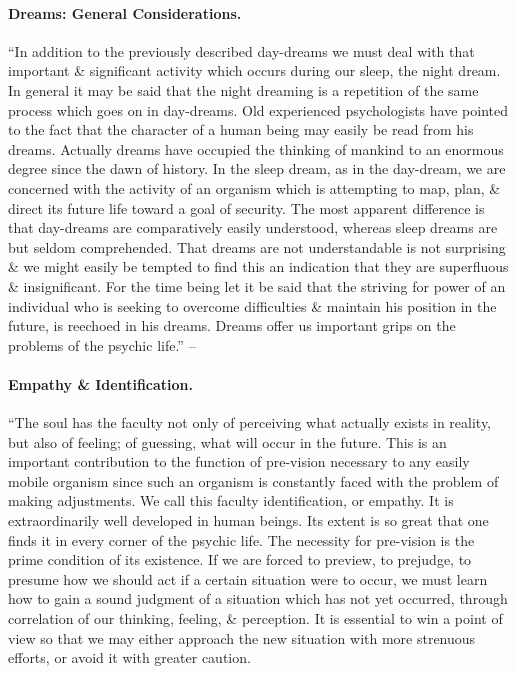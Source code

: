 \documentclass{article}
\begin{document}
\paragraph{Dreams: General Considerations.} ``In addition to the previously described day-dreams we must deal with that important \& significant activity which occurs during our sleep, the night dream. In general it may be said that the night dreaming is a repetition of the same process which goes on in day-dreams. Old experienced psychologists have pointed to the fact that the character of a human being may easily be read from his dreams. Actually dreams have occupied the thinking of mankind to an enormous degree since the dawn of history. In the sleep dream, as in the day-dream, we are concerned with the activity of an organism which is attempting to map, plan, \& direct its future life toward a goal of security. The most apparent difference is that day-dreams are comparatively easily understood, whereas sleep dreams are but seldom comprehended. That dreams are not understandable is not surprising \& we might easily be tempted to find this an indication that they are superfluous \& insignificant. For the time being let it be said that the striving for power of an individual who is seeking to overcome difficulties \& maintain his position in the future, is reechoed in his dreams. Dreams offer us important grips on the problems of the psychic life.'' -- \cite[pp. 59--60]{Adler_human_nature}

\paragraph{Empathy \& Identification.} ``The soul has the faculty not only of perceiving what actually exists in reality, but also of feeling; of guessing, what will occur in the future. This is an important contribution to the function of pre-vision necessary to any easily mobile organism since such an organism is constantly faced with the problem of making adjustments. We call this faculty identification, or empathy. It is extraordinarily well developed in human beings. Its extent is so great that one finds it in every corner of the psychic life. The necessity for pre-vision is the prime condition of its existence. If we are forced to preview, to prejudge, to presume how we should act if a certain situation were to occur, we must learn how to gain a sound judgment of a situation which has not yet occurred, through correlation of our thinking, feeling, \& perception. It is essential to win a point of view so that we may either approach the new situation with more strenuous efforts, or avoid it with greater caution.
\end{document}
